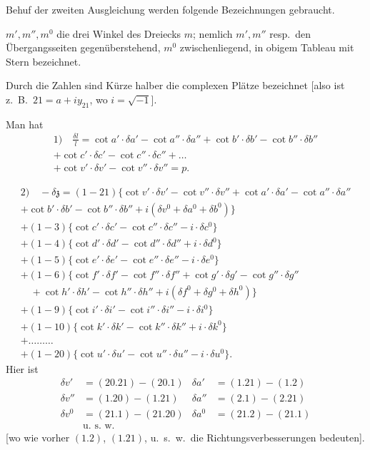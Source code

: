 \documentclass[12pt,a4paper]{article}
\theoremstyle{plain}
\theoremstyle{definition}
\theoremstyle{remark}
\begin{document}
\newpage
Behuf der zweiten Ausgleichung werden folgende Bezeichnungen gebraucht.

$m', m'', m^0$ die drei Winkel des Dreiecks $m$; nemlich $m', m''$ resp.\ den \"Ubergangsseiten gegen\"uberstehend, $m^0$ zwischenliegend, in obigem Tableau mit Stern bezeichnet.

Durch die Zahlen sind K\"urze halber die complexen Pl\"atze bezeichnet [also ist z.\ B.\ $21 = a + iy_{21}$, wo $i = \sqrt{-1}$].

Man hat
\begin{multline*}
\text{1)}\quad \frac{\delta l}{l} = \cot a' \cdot \delta a' - \cot a'' \cdot \delta a'' + \cot b' \cdot \delta b' - \cot b'' \cdot \delta b''\\
+ \cot c' \cdot \delta c' - \cot c'' \cdot \delta c'' + \ldots\\
+ \cot v' \cdot \delta v' - \cot v'' \cdot \delta v'' = p.
\end{multline*}

\begin{multline*}
\text{2)}\quad -\delta\mathfrak{z} = (1 - 21)\{\cot v' \cdot \delta v' - \cot v'' \cdot \delta v'' + \cot a' \cdot \delta a' - \cot a'' \cdot \delta a''\\
+ \cot b' \cdot \delta b' - \cot b'' \cdot \delta b'' + i(\delta v^0 + \delta a^0 + \delta b^0)\}\\
+ (1 - 3)\{\cot c' \cdot \delta c' - \cot c'' \cdot \delta c'' - i \cdot \delta c^0\}\\
+ (1 - 4)\{\cot d' \cdot \delta d' - \cot d'' \cdot \delta d'' + i \cdot \delta d^0\}\\
+ (1 - 5)\{\cot e' \cdot \delta e' - \cot e'' \cdot \delta e'' - i \cdot \delta e^0\}\\
+ (1 - 6)\{\cot f' \cdot \delta f' - \cot f'' \cdot \delta f'' + \cot g' \cdot \delta g' - \cot g'' \cdot \delta g''\\
\quad + \cot h' \cdot \delta h' - \cot h'' \cdot \delta h'' + i(\delta f^0 + \delta g^0 + \delta h^0)\}\\
+ (1 - 9)\{\cot i' \cdot \delta i' - \cot i'' \cdot \delta i'' - i \cdot \delta i^0\}\\
+ (1 - 10)\{\cot k' \cdot \delta k' - \cot k'' \cdot \delta k'' + i \cdot \delta k^0\}\\
+ \ldots\ldots\ldots\\
+ (1 - 20)\{\cot u' \cdot \delta u' - \cot u'' \cdot \delta u'' - i \cdot \delta u^0\}.
\end{multline*}
Hier ist
\begin{align*}
\delta v' &= (20.21) - (20.1) & \delta a' &= (1.21) - (1.2)\\
\delta v'' &= (1.20) - (1.21) & \delta a'' &= (2.1) - (2.21)\\
\delta v^0 &= (21.1) - (21.20) & \delta a^0 &= (21.2) - (21.1)\\
&\text{u.\ s.\ w.}
\end{align*}
[wo wie vorher $(1.2)$, $(1.21)$, u.\ s.\ w.\ die Richtungsverbesserungen bedeuten].
\end{document}

